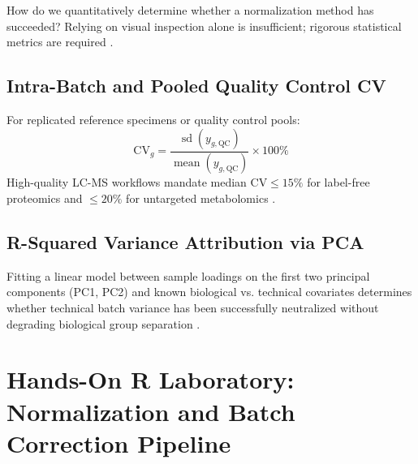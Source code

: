 \documentclass[11pt,oneside]{book}
\begin{document}
How do we quantitatively determine whether a normalization method has succeeded? Relying on visual inspection alone is insufficient; rigorous statistical metrics are required \cite{chawade2014normalyzer}.

\subsection{Intra-Batch and Pooled Quality Control CV}
For replicated reference specimens or quality control pools:
\begin{equation}
\text{CV}_g = \frac{\operatorname{sd}(y_{g,\text{QC}})}{\operatorname{mean}(y_{g,\text{QC}})} \times 100\%
\end{equation}
High-quality LC-MS workflows mandate median $\text{CV} \le 15\%$ for label-free proteomics and $\le 20\%$ for untargeted metabolomics \cite{broadhurst2018guidelines}.

\subsection{R-Squared Variance Attribution via PCA}
Fitting a linear model between sample loadings on the first two principal components (PC1, PC2) and known biological vs. technical covariates determines whether technical batch variance has been successfully neutralized without degrading biological group separation \cite{leek2010tackling}.

\section{Hands-On R Laboratory: Normalization and Batch Correction Pipeline}
\end{document}
